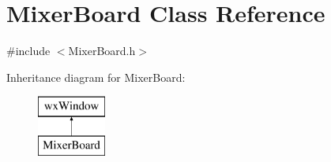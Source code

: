 \hypertarget{class_mixer_board}{}\section{Mixer\+Board Class Reference}
\label{class_mixer_board}


{\ttfamily \#include $<$Mixer\+Board.\+h$>$}

Inheritance diagram for Mixer\+Board\+:\begin{figure}[H]
\begin{center}
\leavevmode
\includegraphics[height=2.000000cm]{class_mixer_board}
\end{center}
\end{figure}
